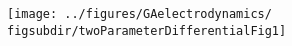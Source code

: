 \documentclass[letterpaper]{article}
\newcommand{\figsubdir}[0]{%
\iftoggle{color-version}{color}{bw}%
}
\begin{document}


\texttt{[image: ../figures/GAelectrodynamics/\\figsubdir/twoParameterDifferentialFig1]}
\end{document}
